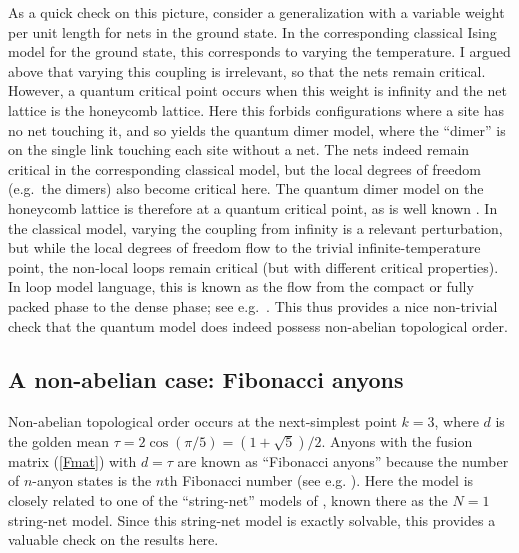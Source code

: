 \documentclass[11pt]{article}
\begin{document}
As a quick check on this picture, consider a generalization with a
variable weight per unit length for nets in the ground state. In the
corresponding classical Ising model for the ground state, this
corresponds to varying the temperature. I argued above that varying
this coupling is irrelevant, so that the nets remain
critical. However, a quantum critical point occurs when this weight is
infinity and the net lattice is the honeycomb lattice. Here
this forbids configurations where a site has no net touching
it, and so yields the quantum dimer model, where the ``dimer'' is
on the single link touching each site without a net.
The nets indeed remain critical in the corresponding classical model,
but the local degrees of freedom (e.g.\ the dimers) also become
critical here. The quantum dimer model on the honeycomb lattice is
therefore at a quantum critical point, as is well known \cite{MSC}. In
the classical model, varying the coupling from infinity is a relevant
perturbation, but while the local degrees of freedom flow to the
trivial infinite-temperature point, the non-local loops remain
critical (but with different critical properties).  In loop model
language, this is known as the flow from the compact or fully packed
phase to the dense phase; see e.g.\ \cite{JK}. This thus provides a
nice non-trivial check that the quantum model does indeed possess
non-abelian topological order.


\subsection{A non-abelian case: Fibonacci anyons}

Non-abelian topological order occurs at the
next-simplest point $k=3$, where $d$ is the golden mean
$\tau=2\cos(\pi/5)=(1+\sqrt{5})/2$. Anyons with the fusion matrix
(\ref{Fmat}) with $d=\tau$ are known as ``Fibonacci anyons''
because the number of $n$-anyon states is the $n$th Fibonacci number
(see e.g. \cite{Preskill}). Here the model is closely related to one
of the ``string-net'' models of \cite{LevinWen}, known there as the
$N=1$ string-net model. Since this string-net model is exactly
solvable, this provides a valuable check on the results here.
\end{document}
